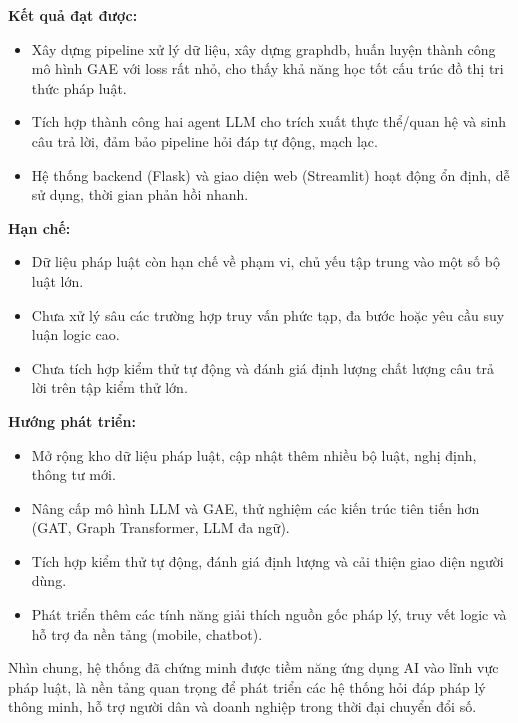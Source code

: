 \documentclass[a4paper]{article}
\begin{document}
\textbf{Kết quả đạt được:}
\begin{itemize}
    \item Xây dựng pipeline xử lý dữ liệu, xây dựng graphdb, huấn luyện thành công mô hình GAE với loss rất nhỏ, cho thấy khả năng học tốt cấu trúc đồ thị tri thức pháp luật.
    \item Tích hợp thành công hai agent LLM cho trích xuất thực thể/quan hệ và sinh câu trả lời, đảm bảo pipeline hỏi đáp tự động, mạch lạc.
    \item Hệ thống backend (Flask) và giao diện web (Streamlit) hoạt động ổn định, dễ sử dụng, thời gian phản hồi nhanh.
\end{itemize}

\textbf{Hạn chế:}
\begin{itemize}
    \item Dữ liệu pháp luật còn hạn chế về phạm vi, chủ yếu tập trung vào một số bộ luật lớn.
    \item Chưa xử lý sâu các trường hợp truy vấn phức tạp, đa bước hoặc yêu cầu suy luận logic cao.
    \item Chưa tích hợp kiểm thử tự động và đánh giá định lượng chất lượng câu trả lời trên tập kiểm thử lớn.
\end{itemize}

\textbf{Hướng phát triển:}
\begin{itemize}
    \item Mở rộng kho dữ liệu pháp luật, cập nhật thêm nhiều bộ luật, nghị định, thông tư mới.
    \item Nâng cấp mô hình LLM và GAE, thử nghiệm các kiến trúc tiên tiến hơn (GAT, Graph Transformer, LLM đa ngữ).
    \item Tích hợp kiểm thử tự động, đánh giá định lượng và cải thiện giao diện người dùng.
    \item Phát triển thêm các tính năng giải thích nguồn gốc pháp lý, truy vết logic và hỗ trợ đa nền tảng (mobile, chatbot).
\end{itemize}

Nhìn chung, hệ thống đã chứng minh được tiềm năng ứng dụng AI vào lĩnh vực pháp luật, là nền tảng quan trọng để phát triển các hệ thống hỏi đáp pháp lý thông minh, hỗ trợ người dân và doanh nghiệp trong thời đại chuyển đổi số.

\newpage
\printbibliography
{}
\end{document}
